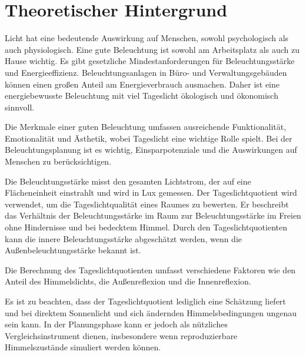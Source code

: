 \section{Theoretischer Hintergrund}
Licht hat eine bedeutende Auswirkung auf Menschen, sowohl psychologisch als auch physiologisch. Eine gute Beleuchtung ist sowohl am Arbeitsplatz als auch zu Hause wichtig. Es gibt gesetzliche Mindestanforderungen für Beleuchtungsstärke und Energieeffizienz. Beleuchtungsanlagen in Büro- und Verwaltungsgebäuden können einen großen Anteil am Energieverbrauch ausmachen. Daher ist eine energiebewusste Beleuchtung mit viel Tageslicht ökologisch und ökonomisch sinnvoll.

Die Merkmale einer guten Beleuchtung umfassen ausreichende Funktionalität, Emotionalität und Ästhetik, wobei Tageslicht eine wichtige Rolle spielt. Bei der Beleuchtungsplanung ist es wichtig, Einsparpotenziale und die Auswirkungen auf Menschen zu berücksichtigen.

Die Beleuchtungsstärke misst den gesamten Lichtstrom, der auf eine Flächeneinheit einstrahlt und wird in Lux gemessen. Der Tageslichtquotient wird verwendet, um die Tageslichtqualität eines Raumes zu bewerten. Er beschreibt das Verhältnis der Beleuchtungsstärke im Raum zur Beleuchtungsstärke im Freien ohne Hindernisse und bei bedecktem Himmel. Durch den Tageslichtquotienten kann die innere Beleuchtungsstärke abgeschätzt werden, wenn die Außenbeleuchtungsstärke bekannt ist.

Die Berechnung des Tageslichtquotienten umfasst verschiedene Faktoren wie den Anteil des Himmelslichts, die Außenreflexion und die Innenreflexion.

Es ist zu beachten, dass der Tageslichtquotient lediglich eine Schätzung liefert und bei direktem Sonnenlicht und sich ändernden Himmelsbedingungen ungenau sein kann. In der Planungsphase kann er jedoch als nützliches Vergleichsinstrument dienen, insbesondere wenn reproduzierbare Himmelszustände simuliert werden können.